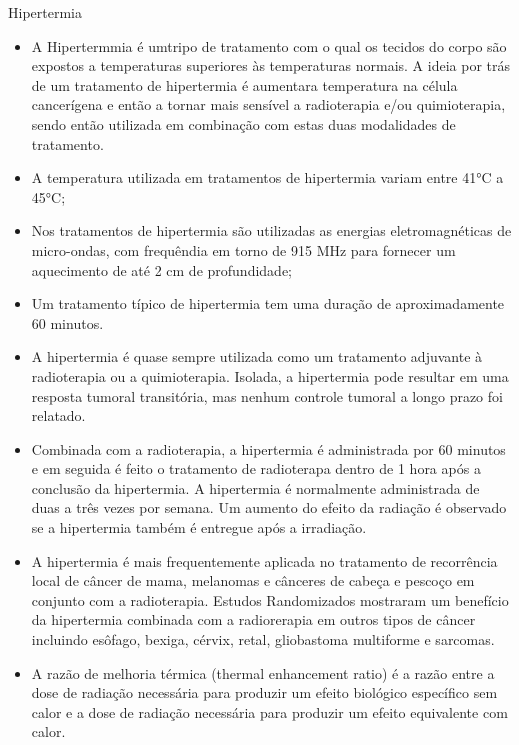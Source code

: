 \documentclass[11pt,a4paper]{article}
\newcounter{exemplo}
\begin{document}
\begin{exemplo}
    \textcolor{CarnationPink}{Hipertermia}
    \begin{itemize}
        \item A Hipertermmia é umtripo de tratamento com o qual os tecidos do corpo são expostos a temperaturas superiores às temperaturas normais. A ideia por trás de um tratamento de hipertermia é aumentara temperatura na célula cancerígena e então a tornar mais sensível a radioterapia e/ou quimioterapia, sendo então utilizada em combinação com estas duas modalidades de tratamento.
        
        \item A temperatura utilizada em tratamentos de hipertermia variam entre \ang{41}C a \ang{45}C;
        
        \item Nos tratamentos de hipertermia são utilizadas as energias eletromagnéticas de micro-ondas, com frequêndia em torno de 915 MHz para fornecer um aquecimento de até 2 cm de profundidade;
        
        \item Um tratamento típico de hipertermia tem uma duração de aproximadamente 60 minutos.
        
        \item A hipertermia é quase sempre utilizada como um tratamento adjuvante à radioterapia ou a quimioterapia. Isolada, a hipertermia pode resultar em uma resposta tumoral transitória, mas nenhum controle tumoral a longo prazo foi relatado.
        
        \item Combinada com a radioterapia, a hipertermia é administrada por 60 minutos e em seguida é feito o tratamento de radioterapa dentro de 1 hora após a conclusão da hipertermia. A hipertermia é normalmente administrada de duas a três vezes por semana. Um aumento do efeito da radiação é observado se a hipertermia também é entregue após a irradiação.
        
        \item A hipertermia é mais frequentemente aplicada no tratamento de recorrência local de câncer de mama, melanomas e cânceres de cabeça e pescoço em conjunto com a radioterapia. Estudos Randomizados mostraram um benefício da hipertermia combinada com a radiorerapia em outros tipos de câncer incluindo esôfago, bexiga, cérvix, retal, gliobastoma multiforme e sarcomas.
        
        \item A razão de melhoria térmica (thermal enhancement ratio) é a razão entre a dose de radiação necessária para produzir um efeito biológico específico sem calor e a dose de radiação necessária para produzir um efeito equivalente com calor.
        

\end{itemize}
\end{exemplo}
\end{document}
